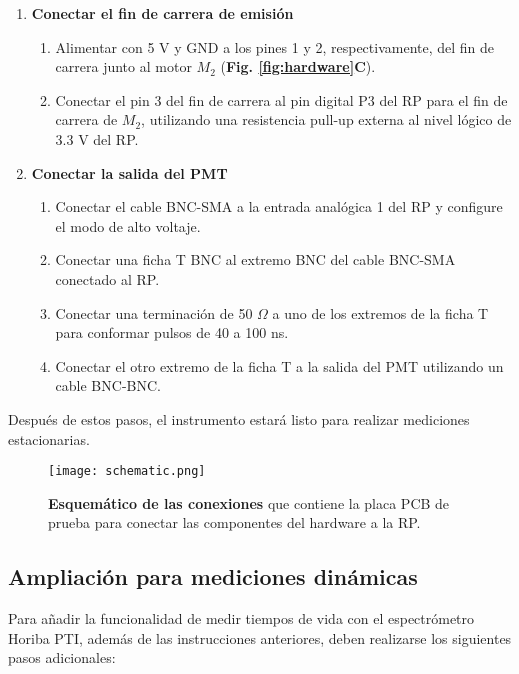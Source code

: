 \begin{enumerate}
\begin{enumerate}
    \end{enumerate}
    \item \textbf{Conectar el fin de carrera de emisión}
    \begin{enumerate}
        \item Alimentar con 5 V y GND a los pines 1 y 2, respectivamente, del fin de carrera junto al motor $M_2$ (\textbf{Fig. \ref{fig:hardware}C}).
        \item Conectar el pin 3 del fin de carrera al pin digital P3 del RP para el fin de carrera de $M_2$, utilizando una resistencia pull-up externa al nivel lógico de 3.3 V del RP.
    \end{enumerate}
    \item \textbf{Conectar la salida del PMT}
    \begin{enumerate}
        \item Conectar el cable BNC-SMA a la entrada analógica 1 del RP y configure el modo de alto voltaje.
        \item Conectar una ficha T BNC al extremo BNC del cable BNC-SMA conectado al RP.
        \item Conectar una terminación de 50 $\Omega$ a uno de los extremos de la ficha T para conformar pulsos de 40 a 100 ns.
        \item Conectar el otro extremo de la ficha T a la salida del PMT utilizando un cable BNC-BNC.
    \end{enumerate}
\end{enumerate}

\noindent Después de estos pasos, el instrumento estará listo para realizar mediciones estacionarias.

\begin{SCfigure}[][h]
         \centering
         \texttt{[image: schematic.png]}
         \caption{\textbf{Esquemático de las conexiones} que contiene la placa PCB de prueba para conectar las componentes del hardware a la RP.
         }
         \label{fig:schematic}
    \end{SCfigure}


\subsection{Ampliación para mediciones dinámicas}

Para añadir la funcionalidad de medir tiempos de vida con el espectrómetro Horiba PTI, además de las instrucciones anteriores, deben realizarse los siguientes pasos adicionales:


